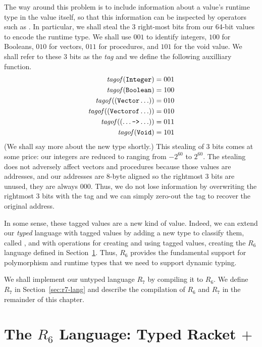 \documentclass[11pt]{book}
\begin{document}
The way around this problem is to include information about a value's
runtime type in the value itself, so that this information can be
inspected by operators such as .  In particular, we shall
steal the 3 right-most bits from our 64-bit values to encode the
runtime type.  We shall use $001$ to identify integers, $100$ for
Booleans, $010$ for vectors, $011$ for procedures, and $101$ for the
void value. We shall refer to these 3 bits as the \emph{tag} and we
define the following auxilliary function.
\begin{align*}
\mathit{tagof}(\texttt{Integer}) &= 001 \\
\mathit{tagof}(\texttt{Boolean}) &= 100 \\
\mathit{tagof}((\texttt{Vector} \ldots)) &= 010 \\
\mathit{tagof}((\texttt{Vectorof} \ldots)) &= 010 \\
\mathit{tagof}((\ldots \texttt{->} \ldots)) &= 011 \\
\mathit{tagof}(\texttt{Void}) &= 101
\end{align*}
(We shall say more about the new  type shortly.)
This stealing of 3 bits comes at some
price: our integers are reduced to ranging from $-2^{60}$ to
$2^{60}$. The stealing does not adversely affect vectors and
procedures because those values are addresses, and our addresses are
8-byte aligned so the rightmost 3 bits are unused, they are always
$000$. Thus, we do not lose information by overwriting the rightmost 3
bits with the tag and we can simply zero-out the tag to recover the
original address.

In some sense, these tagged values are a new kind of value.  Indeed,
we can extend our \emph{typed} language with tagged values by adding a
new type to classify them, called , and with operations for
creating and using tagged values, creating the $R_6$ language defined
in Section~\ref{sec:r6-lang}. Thus, $R_6$ provides the fundamental
support for polymorphism and runtime types that we need to support
dynamic typing.

We shall implement our untyped language $R_7$ by compiling it to
$R_6$. We define $R_7$ in Section~\ref{sec:r7-lang} and describe the
compilation of $R_6$ and $R_7$ in the remainder of this chapter.

\section{The $R_6$ Language: Typed Racket $+$ }
\label{sec:r6-lang}
\end{document}
